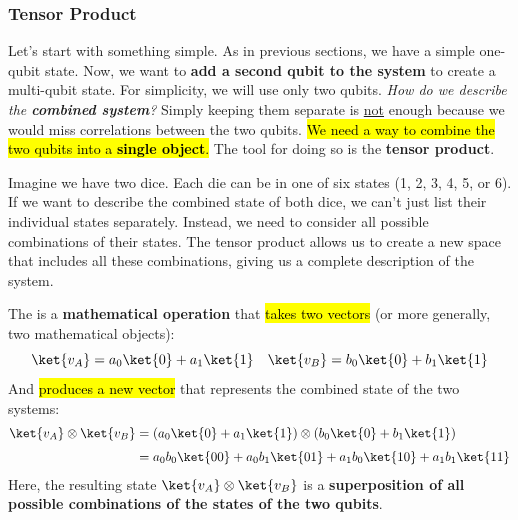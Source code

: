\subsubsection{Tensor Product}\label{subsubsec:tensor-product}

Let's start with something simple. As in previous sections, we have a simple one-qubit state. Now, we want to \textbf{add a second qubit to the system} to create a multi-qubit state. For simplicity, we will use only two qubits. \emph{How do we describe the \textbf{combined system}?} Simply keeping them separate is \underline{not} enough because we would miss correlations between the two qubits. \hl{We need a way to combine the two qubits into a \textbf{single object}.} The tool for doing so is the \textbf{tensor product}.

\highspace
\begin{examplebox}
    Imagine we have two dice. Each die can be in one of six states (1, 2, 3, 4, 5, or 6). If we want to describe the combined state of both dice, we can't just list their individual states separately. Instead, we need to consider all possible combinations of their states. The tensor product allows us to create a new space that includes all these combinations, giving us a complete description of the system.
\end{examplebox}

\highspace
The  is a \textbf{mathematical operation} that \hl{takes two vectors} (or more generally, two mathematical objects):
\begin{equation*}
    \ket{v_A} = a_0\ket{0} + a_1\ket{1} \quad \ket{v_B} = b_0\ket{0} + b_1\ket{1}
\end{equation*}
And \hl{produces a new vector} that represents the combined state of the two systems:
\begin{equation}
\begin{aligned}
    \ket{v_A} \otimes \ket{v_B} &= (a_0\ket{0} + a_1\ket{1}) \otimes (b_0\ket{0} + b_1\ket{1}) \\[.3em]
    &= a_0b_0\ket{00} + a_0b_1\ket{01} + a_1b_0\ket{10} + a_1b_1\ket{11}
\end{aligned}
\end{equation}
Here, the resulting state $\ket{v_A} \otimes \ket{v_B}$ is a \textbf{superposition of all possible combinations of the states of the two qubits}.

